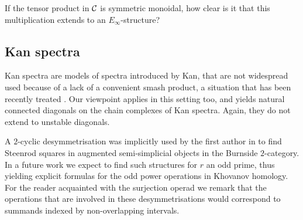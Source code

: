 If the tensor product in $\mathcal{C}$ is symmetric monoidal, how clear is it that this multiplication extends to an $E_{\infty}$-structure? 



\subsection{Kan spectra}

Kan spectra \cite{Kan1963} are models of spectra introduced by Kan, that are not widespread used because of a lack of a convenient smash product, a situation that has been recently treated \cite{CKP2023}.
Our viewpoint applies in this setting too, and yields natural connected diagonals on the chain complexes of Kan spectra.
Again, they do not extend to unstable diagonals.


A $2$-cyclic desymmetrisation was implicitly used by the first author in \cite{cantero-moran2020khovanov} to find Steenrod squares in augmented semi-simplicial objects in the Burnside $2$-category.
In a future work we expect to find such structures for $r$ an odd prime, thus yielding explicit formulas for the odd power operations in Khovanov homology.
For the reader acquainted with the surjection operad we remark that the operations that are involved in these desymmetrisations would correspond to summands indexed by non-overlapping intervals.


